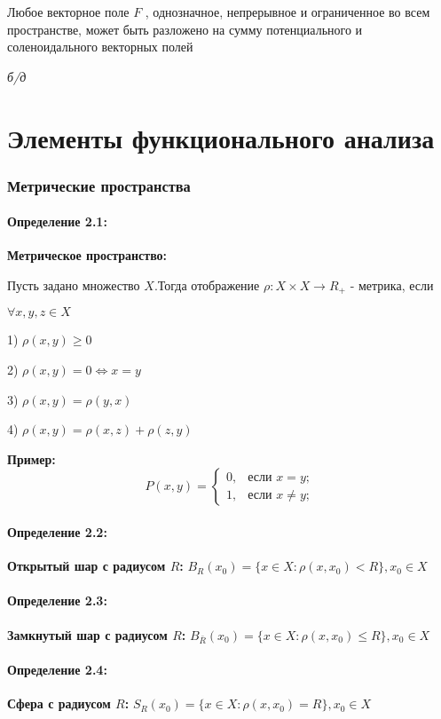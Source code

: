 \documentclass[12pt, english]{article}
\begin{document}
		Любое векторное поле $F$ , однозначное, непрерывное и ограниченное во всем пространстве, может быть разложено на сумму потенциального и соленоидального векторных полей	
	
	\textit{б/д}
	
	
\part{Элементы функционального анализа}
\section{Метрические пространства}
\subsection*{Определение 2.1:}
	\textbf{Метрическое пространство:}
	
	Пусть задано множество $X$.Тогда отображение $\rho: X \times X \to R_+$ - метрика, если 
	
	$\forall x,y,z \in X$
	
	1) $\rho(x,y) \ge 0$
	
	2) $\rho(x,y) = 0 \Leftrightarrow x = y$
	
	3) $\rho(x,y) = \rho(y,x)$
	
	4) $\rho(x,y) = \rho(x,z) + \rho(z,y) $
	
\textbf{Пример:}
	$$
P(x,y) = \begin{cases}
   0, &\text{если } x = y; \\
   1, &\text{если } x \neq y;
\end{cases}
$$	
	
\subsection*{Определение 2.2:}
	\textbf{Открытый шар с радиусом $R$:}
	$B_R(x_0) = \{{x \in X : \rho(x,x_0) < R}\} , x_0 \in X$
	
\subsection*{Определение 2.3:}
	\textbf{Замкнутый шар с радиусом $R$:}
	$B_{\bar{R}}(x_0) = \{{x \in X : \rho(x,x_0) \leq R}\} , x_0 \in X$

\subsection*{Определение 2.4:}
	\textbf{Сфера с радиусом $R$:}
	$S_R(x_0) = \{{x \in X : \rho(x,x_0) = R}\} , x_0 \in X$
\end{document}
